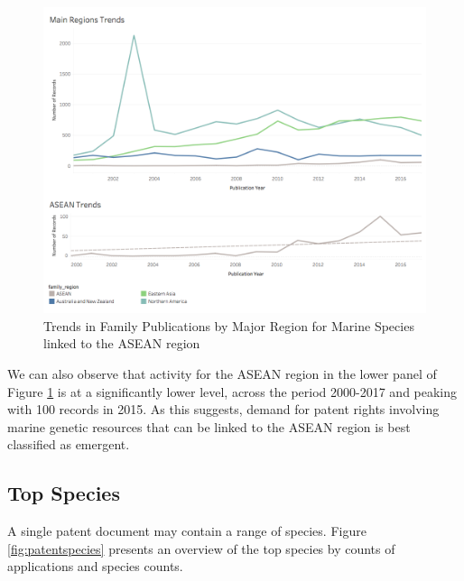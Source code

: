 \documentclass[]{book}
\theoremstyle{definition}
\theoremstyle{definition}
\theoremstyle{definition}
\theoremstyle{remark}
\begin{document}
\begin{figure}

{\centering \includegraphics[width=1\linewidth]{images-patents/family_trends_region} 

}

\caption{Trends in Family Publications by Major Region for Marine Species linked to the ASEAN region}\label{fig:familyregiontrends}
\end{figure}

We can also observe that activity for the ASEAN region in the lower
panel of Figure \ref{fig:familyregiontrends} is at a significantly lower
level, across the period 2000-2017 and peaking with 100 records in 2015.
As this suggests, demand for patent rights involving marine genetic
resources that can be linked to the ASEAN region is best classified as
emergent.

\hypertarget{top-species}{%
\subsection{Top Species}\label{top-species}}

A single patent document may contain a range of species. Figure
\ref{fig:patentspecies} presents an overview of the top species by
counts of applications and species counts.
\end{document}
